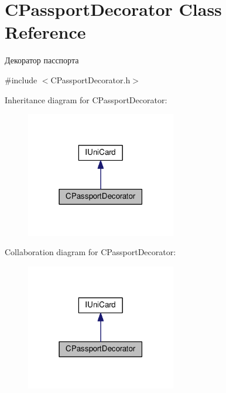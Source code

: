 \hypertarget{classCPassportDecorator}{}\section{C\+Passport\+Decorator Class Reference}
\label{classCPassportDecorator}


Декоратор пасспорта  




{\ttfamily \#include $<$C\+Passport\+Decorator.\+h$>$}



Inheritance diagram for C\+Passport\+Decorator\+:\nopagebreak
\begin{figure}[H]
\begin{center}
\leavevmode
\includegraphics[width=186pt]{classCPassportDecorator__inherit__graph}
\end{center}
\end{figure}


Collaboration diagram for C\+Passport\+Decorator\+:\nopagebreak
\begin{figure}[H]
\begin{center}
\leavevmode
\includegraphics[width=186pt]{classCPassportDecorator__coll__graph}
\end{center}
\end{figure}
